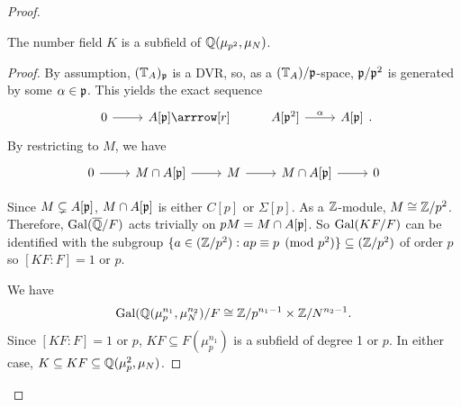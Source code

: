 \documentclass[thesis.tex]{subfiles}
\begin{document}
\begin{proof}
    \begin{lemma}
        The number field $K$ is a subfield of $\mathbb{Q}(\mu_{p^2}, \mu_N)$.
    \end{lemma}
    \begin{proof}
        By assumption, $(\mathbb{T}_A)_{\mathfrak{p}}$ is a DVR\@, so, as a $(\mathbb{T}_A)/\mathfrak{p}$-space,
        $\mathfrak{p}/\mathfrak{p}^2$ is generated by some $\alpha\in \mathfrak{p}$. This yields the exact
        sequence
        \[
            \begin{tikzcd}
                0 \arrow[r] &
                A[\p] \arrrow[r] &
                A[\p^2] \arrow[r, "\alpha"] &
                A[\p]
            \end{tikzcd}.
        \]
        By restricting to $M$, we have
        \begin{equation}
            \label{eq:M_Ap}
            \begin{tikzcd}
                0 \arrow[r] &
                M\cap A[\p] \arrow[r] &
                M \arrow[r] &
                M\cap A[\p] \arrow[r] &
                0
            \end{tikzcd} 
        \end{equation}

        Since $M\subsetneq A[\mathfrak{p}]$, $M\cap A[\mathfrak{p}]$ is either $C[p]$ or
        $\Sigma[p]$. As a $\mathbb{Z}$-module, $M\cong \mathbb{Z}/p^2$. Therefore,
        $\operatorname{Gal}(\overline{\mathbb{Q}}/F)$ acts trivially on $pM=M\cap A[\mathfrak{p}]$. So $\operatorname{Gal}(KF/F)$
        can be identified with the subgroup $\{a\in (\mathbb{Z}/p^2):ap\equiv p
        \pmod{p^2}\}\subseteq (\mathbb{Z}/p^2)$ of order $p$ so $[KF:F]=1$ or $p$.

        We have 
        \[
            \operatorname{Gal}(\mathbb{Q}(\mu_p ^{n_1}, \mu_N ^{n_2})/F \cong \mathbb{Z}/p^{n_1-1} \times
            \mathbb{Z}/N^{n_2-1}.
        \]
        Since $[KF:F]=1$ or $p$, $KF\subseteq F(\mu_p ^{n_1})$ is a subfield of
        degree 1 or $p$. In either case, $K\subseteq KF \subseteq \mathbb{Q}(\mu_p ^2,
        \mu_N)$.
    \end{proof}
\end{proof}
\end{document}
